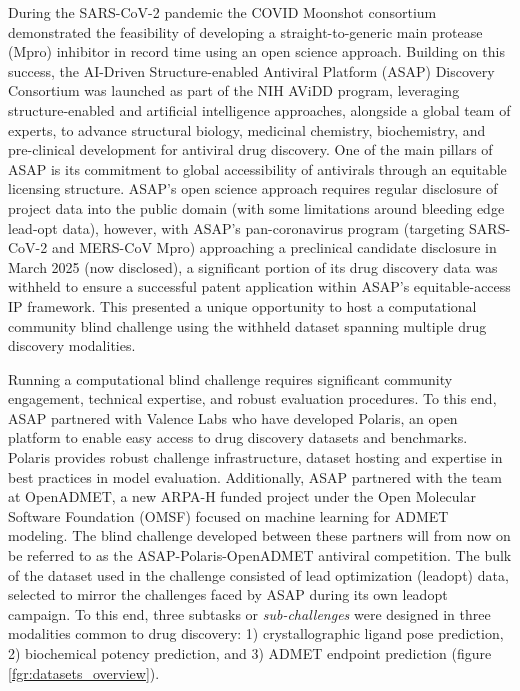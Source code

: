 \documentclass[journal=jcim,manuscript=article]{achemso}
\begin{document}
During the SARS-CoV-2 pandemic the COVID Moonshot consortium\cite{boby_2023} demonstrated the feasibility of developing a straight-to-generic main protease (Mpro) inhibitor in record time using an open science approach. Building on this success, the AI-Driven Structure-enabled Antiviral Platform (ASAP) Discovery Consortium was launched as part of the NIH AViDD program, leveraging structure-enabled and artificial intelligence approaches, alongside a global team of experts, to advance structural biology, medicinal chemistry, biochemistry, and pre-clinical development for antiviral drug discovery. One of the main pillars of ASAP is its commitment to global accessibility of antivirals through an equitable licensing structure\cite{griffen_2024}. ASAP's open science approach requires regular disclosure of project data into the public domain (with some limitations around bleeding edge lead-opt data), however, with ASAP's pan-coronavirus program (targeting SARS-CoV-2 and MERS-CoV Mpro) approaching a preclinical candidate disclosure in March 2025 (now disclosed)\cite{griffen_2025_acs}, a significant portion of its drug discovery data was withheld to ensure a successful patent application within ASAP's equitable-access IP framework. This presented a unique opportunity to host a computational community blind challenge using the withheld dataset spanning multiple drug discovery modalities.

Running a computational blind challenge requires significant community engagement, technical expertise, and robust evaluation procedures. To this end, ASAP partnered with Valence Labs who have developed Polaris, an open platform to enable easy access to drug discovery datasets and benchmarks. Polaris provides robust challenge infrastructure, dataset hosting and expertise in best practices in model evaluation. Additionally, ASAP partnered with the team at OpenADMET, a new ARPA-H funded project under the Open Molecular Software Foundation (OMSF) focused on machine learning for ADMET modeling. The blind challenge developed between these partners will from now on be referred to as the ASAP-Polaris-OpenADMET antiviral competition. 
The bulk of the dataset used in the challenge consisted of lead optimization (leadopt) data, selected to mirror the challenges faced by ASAP during its own leadopt campaign. To this end, three subtasks or \textit{sub-challenges} were designed in three modalities common to drug discovery: 1) crystallographic ligand pose prediction, 2) biochemical potency prediction, and 3) ADMET endpoint prediction (figure \ref{fgr:datasets_overview}).
\end{document}
